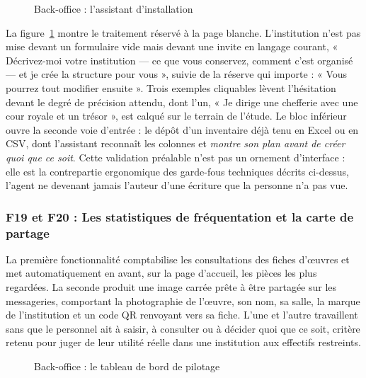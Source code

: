 \begin{figure}[htbp]
\centering
{}
\caption{Back-office : l'assistant d'installation}
\label{fig:cap-setup}
\end{figure}

La figure~\ref{fig:cap-setup} montre le traitement réservé à la page blanche.
L'institution n'est pas mise devant un formulaire vide mais devant une invite en
langage courant, « Décrivez-moi votre institution — ce que vous conservez,
comment c'est organisé — et je crée la structure pour vous », suivie de la
réserve qui importe : « Vous pourrez tout modifier ensuite ». Trois exemples
cliquables lèvent l'hésitation devant le degré de précision attendu, dont l'un,
« Je dirige une chefferie avec une cour royale et un trésor », est calqué sur le
terrain de l'étude. Le bloc inférieur ouvre la seconde voie d'entrée : le dépôt
d'un inventaire déjà tenu en Excel ou en CSV, dont l'assistant reconnaît les
colonnes et \emph{montre son plan avant de créer quoi que ce soit}. Cette
validation préalable n'est pas un ornement d'interface : elle est la contrepartie
ergonomique des garde-fous techniques décrits ci-dessus, l'agent ne devenant
jamais l'auteur d'une écriture que la personne n'a pas vue.

\subsubsection{F19 et F20 : Les statistiques de fréquentation et la carte de partage}

La première fonctionnalité comptabilise les consultations des fiches d'œuvres et
met automatiquement en avant, sur la page d'accueil, les pièces les plus
regardées. La seconde produit une image carrée prête à être partagée sur les
messageries, comportant la photographie de l'œuvre, son nom, sa salle, la marque
de l'institution et un code QR renvoyant vers sa fiche. L'une et l'autre
travaillent sans que le personnel ait à saisir, à consulter ou à décider quoi
que ce soit, critère retenu pour juger de leur utilité réelle dans une
institution aux effectifs restreints.

\begin{figure}[htbp]
\centering
{}
\caption{Back-office : le tableau de bord de pilotage}
\label{fig:cap-dashboard}
\end{figure}

